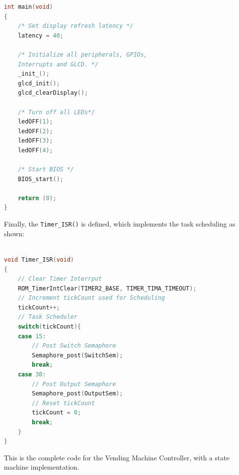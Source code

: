 \documentclass{article}
\begin{document}
      \begin{lstlisting}[basicstyle = \small, language = C]
int main(void)
{
    /* Set display refresh latency */
    latency = 40;
    
    /* Initialize all peripherals, GPIOs, 
    Interrupts and GLCD. */
    _init_();
    glcd_init();
    glcd_clearDisplay();
    
    /* Turn off all LEDs*/
    ledOFF(1);
    ledOFF(2);
    ledOFF(3);
    ledOFF(4);
    
    /* Start BIOS */
    BIOS_start();

    return (0);
}
  \end{lstlisting}
\qquad Finally, the \texttt{Timer\_ISR()} is defined, which implements the task scheduling as shown: \\ \\
      \begin{lstlisting}[basicstyle = \small, language = C]
void Timer_ISR(void)
{
    // Clear Timer Interrput
    ROM_TimerIntClear(TIMER2_BASE, TIMER_TIMA_TIMEOUT);
    // Increment tickCount used for Scheduling
    tickCount++;
    // Task Scheduler
    switch(tickCount){
    case 15:
        // Post Switch Semaphore
        Semaphore_post(SwitchSem);
        break;
    case 30:
        // Post Output Semaphore
        Semaphore_post(OutputSem);
        // Reset tickCount
        tickCount = 0;
        break;
    }
}
  \end{lstlisting}
This is the complete code for the Vending Machine Controller, with a state machine implementation.
\end{document}
